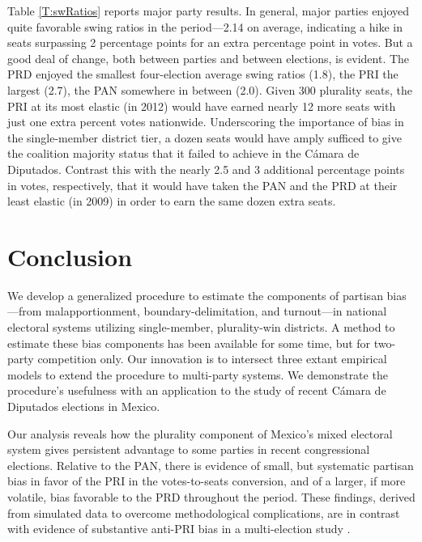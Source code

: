 \documentclass[letter,12pt]{article}
\begin{document}
Table \ref{T:swRatios} reports major party results. In general, major parties enjoyed quite favorable swing ratios in the period---2.14 on average, indicating a hike in seats surpassing 2 percentage points for an extra percentage point in votes. But a good deal of change, both between parties and between elections, is evident. The PRD enjoyed the smallest four-election average swing ratios (1.8), the PRI the largest (2.7), the PAN somewhere in between (2.0). Given 300 plurality seats, the PRI at its most elastic (in 2012) would have earned nearly 12 more seats with just one extra percent votes nationwide. Underscoring the importance of bias in the single-member district tier, a dozen seats would have amply sufficed to give the coalition majority status that it failed to achieve in the C\'amara de Diputados. Contrast this with the nearly 2.5 and 3 additional percentage points in votes, respectively, that it would have taken the PAN and the PRD at their least elastic (in 2009) in order to earn the same dozen extra seats. 


\section{Conclusion}

We develop a generalized procedure to estimate the components of partisan bias---from malapportionment, boundary-delimitation, and  turnout---in national electoral systems utilizing single-member, plurality-win districts. A method to estimate these bias components has been available for some time, but for two-party competition only. Our innovation is to intersect three extant empirical models to extend the procedure to multi-party systems. We demonstrate the procedure's usefulness with an application to the study of recent C\'amara de Diputados elections in Mexico. 

Our analysis reveals how the plurality component of Mexico's mixed electoral system gives persistent advantage to some parties in recent congressional elections. Relative to the PAN, there is evidence of small, but systematic partisan bias in favor of the PRI in the votes-to-seats conversion, and of a larger, if more volatile, bias favorable to the PRD throughout the period. These findings, derived from simulated data to overcome methodological complications, are in contrast with evidence of substantive anti-PRI bias in a multi-election study \citep{marquez2014biasBlog}. 
\end{document}

